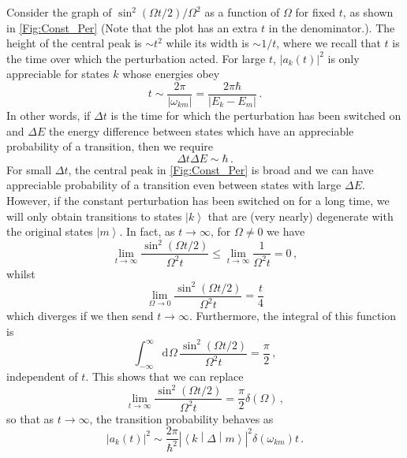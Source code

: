\documentclass{article}
\theoremstyle{plain}\theoremheaderfont{\normalfont\itshape}\theorembodyfont{\rmfamily}\theoremseparator{.}\newtheorem*{rem}{Remark}\newtheorem*{ex}{Example}\newtheorem*{proof}{Proof}\newtheorem*{altp}{Alternative proof}
\theoremstyle{plain}\theoremheaderfont{\normalfont\bfseries}\theorembodyfont{\rmfamily}\theoremseparator{.}\newtheorem{thm}{Theorem}[section]\newtheorem{lem}[thm]{Lemma}\newtheorem{prop}[thm]{Proposition}\newtheorem*{cor}{Corollary}\newtheorem{defn}[thm]{Definition}\newtheorem{clm}[thm]{Claim}\newtheorem{clminproof}{Claim}
\theoremstyle{break}\theoremheaderfont{\normalfont\itshape}\theorembodyfont{\rmfamily}\theoremseparator{.\medskip}\newtheorem*{proofskip}{Proof}\newtheorem*{exs}{Examples}\newtheorem*{rems}{Remarks}
\theoremstyle{break}\theoremheaderfont{\normalfont\bfseries}\theorembodyfont{\rmfamily}\theoremseparator{.\medskip}\newtheorem{lemskip}[thm]{Lemma}\newtheorem{defnskip}[thm]{Definition}\newtheorem{propskip}[thm]{Proposition}\newtheorem{thmskip}[thm]{Theorem}
\numberwithin{equation}{section}
\newcommand{\dd}[2][]{\mathrm{d}^{#1} #2\,}
\newcommand{\ket}[1]{\left| #1 \right\rangle}
\newcommand{\mel}[3]{\left\langle #1 \middle| #2 \middle| #3 \right\rangle}
\newcommand{\abs}[1]{\left| #1 \right|}
\begin{document}
    Consider the graph of \(\sin^2(\Omega t/2)/\Omega^2\) as a function of \(\Omega\) for fixed \(t\), as shown in \cref{Fig:Const_Per} (Note that the plot has an extra \(t\) in the denominator.). The height of the central peak is \(\sim t^2\) while its width is \(\sim 1/t\), where we recall that \(t\) is the time over which the perturbation acted. For large \(t\), \(\abs{a_k(t)}^2\) is only appreciable for states \(k\) whose energies obey
    \begin{equation}
        t\sim\frac{2\pi}{\abs{\omega_{km}}}=\frac{2\pi\hbar}{\abs{E_k-E_m}}\,.
    \end{equation}
    In other words, if \(\Delta t\) is the time for which the perturbation has been switched on and \(\Delta E\) the energy difference between states which have an appreciable probability of a transition, then we require
    \begin{equation}
        \Delta t\Delta E\sim\hbar\,.
    \end{equation}
    For small \(\Delta t\), the central peak in \cref{Fig:Const_Per} is broad and we can have appreciable probability of a transition even between states with large \(\Delta E\). However, if the constant perturbation has been switched on for a long time, we will only obtain transitions to states \(\ket{k}\) that are (very nearly) degenerate with the original states \(\ket{m}\). In fact, as \(t\to\infty\), for \(\Omega\ne 0\) we have
    \begin{equation}
        \lim_{t\to\infty}\frac{\sin^2(\Omega t/2)}{\Omega^2 t}\le\lim_{t\to\infty}\frac{1}{\Omega^2 t}=0\,,
    \end{equation}
    whilst
    \begin{equation}
        \lim_{\Omega\to 0}\frac{\sin^2(\Omega t/2)}{\Omega^2 t}=\frac{t}{4}
    \end{equation}
    which diverges if we then send \(t\to\infty\). Furthermore, the integral of this function is
    \begin{equation}
        \int_{-\infty}^{\infty}\dd{\Omega}\frac{\sin^2(\Omega t/2)}{\Omega^2 t}=\frac{\pi}{2}\,,
    \end{equation}
    independent of \(t\). This shows that we can replace
    \begin{equation}
        \lim_{t\to\infty}\frac{\sin^2(\Omega t/2)}{\Omega^2 t}=\frac{\pi}{2}\delta(\Omega)\,,
    \end{equation}
    so that as \(t\to\infty\), the transition probability behaves as
    \begin{equation}
        \abs{a_k(t)}^2\sim\frac{2\pi}{\hbar^2}\abs{\mel{k}{\Delta}{m}}^2\delta(\omega_{km})t\,.
    \end{equation}
\end{document}
